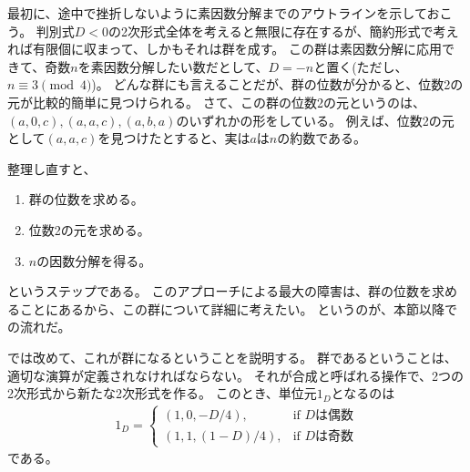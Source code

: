 最初に、途中で挫折しないように素因数分解までのアウトラインを示しておこう。
判別式$D<0$の2次形式全体を考えると無限に存在するが、簡約形式で考えれば有限個に収まって、しかもそれは群を成す。
この群は素因数分解に応用できて、奇数$n$を素因数分解したい数だとして、$D=-n$と置く(ただし、$n\equiv3\pmod{4}$)。
どんな群にも言えることだが、群の位数が分かると、位数2の元が比較的簡単に見つけられる。
さて、この群の位数2の元というのは、$(a,0,c),(a,a,c),(a,b,a)$のいずれかの形をしている。
例えば、位数2の元として$(a,a,c)$を見つけたとすると、実は$a$は$n$の約数である。

整理し直すと、
\begin{enumerate}
 \item 群の位数を求める。
 \item 位数2の元を求める。
 \item $n$の因数分解を得る。
\end{enumerate}
というステップである。
このアプローチによる最大の障害は、群の位数を求めることにあるから、この群について詳細に考えたい。
というのが、本節以降での流れだ。

では改めて、これが群になるということを説明する。
群であるということは、適切な演算が定義されなければならない。
それが合成と呼ばれる操作で、2つの2次形式から新たな2次形式を作る。
このとき、単位元$1_D$となるのは
\begin{align*}
1_D = \begin{cases}
(1, 0, -D/4),& \mbox{if $D$は偶数}\\
(1, 1, (1-D)/4),& \mbox{if $D$は奇数}
\end{cases}
\end{align*}
である。

